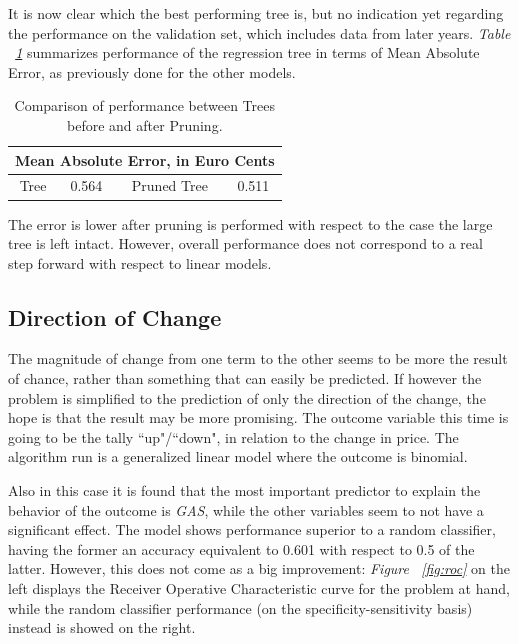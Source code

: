 \documentclass[a4paper,12pt]{book}
\begin{document}
It is now clear which the best performing tree is, but no indication yet regarding the performance on the validation set, which includes data from later years. \textit{Table ~\ref{Tab:prune}} summarizes performance of the regression tree in terms of Mean Absolute Error, as previously done for the other models.

\begin{table}[tb]
\begin{center}
\begin{tabular}{|c|c|c|c|}
\hline
\multicolumn{4}{|c|}{Mean Absolute Error, in Euro Cents}\\
\hline
Tree&0.564&Pruned Tree&0.511\\
\hline
\end{tabular}
\caption{Comparison of performance between Trees before and after Pruning.}
\label{Tab:prune}
\end{center}
\end{table}

The error is lower after pruning is performed with respect to the case the large tree is left intact. However, overall performance does not correspond to a real step forward with respect to linear models.

\subsection{Direction of Change}

The magnitude of change from one term to the other seems to be more the result of chance, rather than something that can easily be predicted. If however the problem is simplified to the prediction of only the direction of the change, the hope is that the result may be more promising. The outcome variable this time is going to be the tally ``up"/``down", in relation to the change in price. The algorithm run is a generalized linear model where the outcome is binomial.

Also in this case it is found that the most important predictor to explain the behavior of the outcome is \textit{GAS}, while the other variables seem to not have a significant effect. The model shows performance superior to a random classifier, having the former an accuracy equivalent to 0.601 with respect to 0.5 of the latter. However, this does not come as a big improvement: \textit{Figure ~\ref{fig:roc}} on the left displays the Receiver Operative Characteristic curve for the problem at hand, while the random classifier performance (on the specificity-sensitivity basis) instead is showed on the right.
\end{document}
